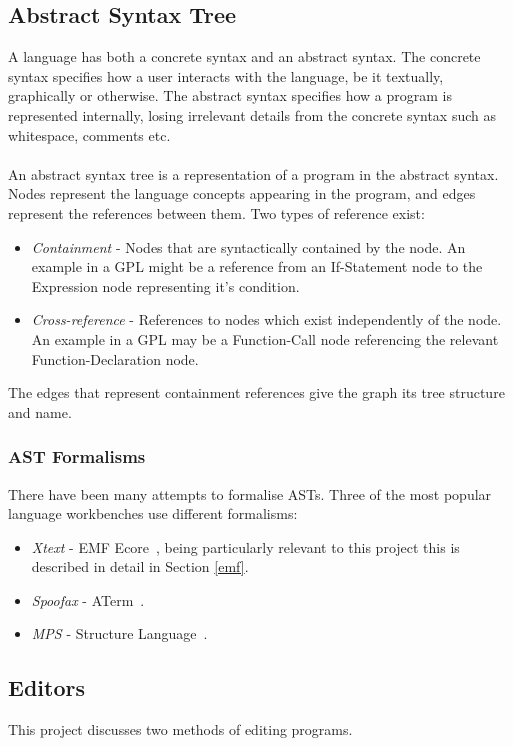 \documentclass{article}
\begin{document}
\subsection{Abstract Syntax Tree}
A language has both a concrete syntax and an abstract syntax. The concrete syntax specifies how a user interacts with the language, be it textually, graphically or otherwise. The abstract syntax specifies how a program is represented internally, losing irrelevant details from the concrete syntax such as whitespace, comments etc.
\\
\\
An abstract syntax tree is a representation of a program in the abstract syntax. Nodes represent the language concepts appearing in the program, and edges represent the references between them. Two types of reference exist:
\begin{itemize}
\item \emph{Containment} - Nodes that are syntactically contained by the node. An example in a GPL might be a reference from an If-Statement node to the Expression node representing it's condition.
\item \emph{Cross-reference} - References to nodes which exist independently of the node. An example in a GPL may be a Function-Call node referencing the relevant Function-Declaration node. 
\end{itemize}
The edges that represent containment references give the graph its tree structure and name.
\subsubsection{AST Formalisms}\label{astFormalisms}
There have been many attempts to formalise ASTs. Three of the most popular language workbenches use different formalisms: \begin{itemize}
\item \emph{Xtext} - EMF Ecore~\cite{emf}, being particularly relevant to this project this is described in detail in Section \ref{emf}.
\item \emph{Spoofax} - ATerm~\cite{aterm}.
\item \emph{MPS} - Structure Language~\cite{mpsStructureLanguage}.
\end{itemize}
%
\subsection{Editors}
This project discusses two methods of editing programs.
\end{document}
